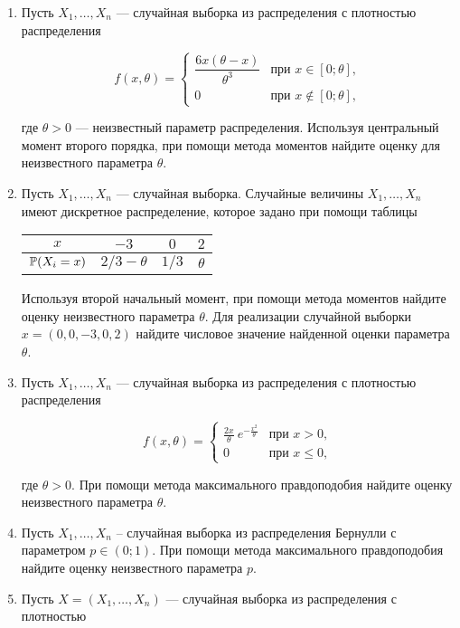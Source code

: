 \begin{enumerate}
\item Пусть $X_1, \ldots ,X_n$ — случайная выборка из распределения
с плотностью распределения

\[
f(x,\theta) =
\begin{cases}
\dfrac{6x(\theta-x)}{\theta^3} & \text{при } x \in [0;\theta], \\
0 & \text{при } x \not\in [0;\theta],
\end{cases}
\]

где $\theta > 0$ — неизвестный параметр распределения.
Используя центральный момент второго порядка, при помощи метода моментов
найдите оценку для неизвестного параметра $\theta$.

\item Пусть $X_1, \ldots,X_n$ — случайная выборка. Случайные величины $X_1, \ldots, X_n$ имеют дискретное распределение, которое задано при помощи таблицы

\begin{center}
\begin{tabular}{cccc}
\toprule
 $x$ & $-3$  &$ 0 $  & $2 $  \\
 \midrule
 $\P(X_i = x)$ & $2/3 - \theta$ & $1/3$ & $\theta$ \\
 \bottomrule
\end{tabular}
\end{center}

Используя второй начальный момент, при помощи метода моментов
найдите оценку неизвестного параметра $\theta$.
Для реализации случайной выборки $x=(0,0,-3,0,2)$
найдите числовое значение найденной оценки параметра $\theta$.

\item Пусть $X_1, \ldots,X_n$ — случайная выборка из распределения
с плотностью распределения

\[
f(x,\theta) =
\begin{cases}
\frac{2x}{\theta} \ e^{-\frac{x^2}{\theta}} & \text{при } x>0, \\
0 & \text{при } x \leq 0,
\end{cases}
\]

где $\theta > 0$. При помощи метода максимального правдоподобия найдите оценку неизвестного параметра $\theta$.

\item Пусть $X_1, \ldots, X_n$ – случайная выборка из распределения Бернулли
с параметром $p \in (0;1)$.
При помощи метода максимального правдоподобия найдите оценку
неизвестного параметра $p$.

\item Пусть $X=(X_1, \ldots, X_n)$ — случайная выборка из распределения с плотностью


\end{enumerate}
